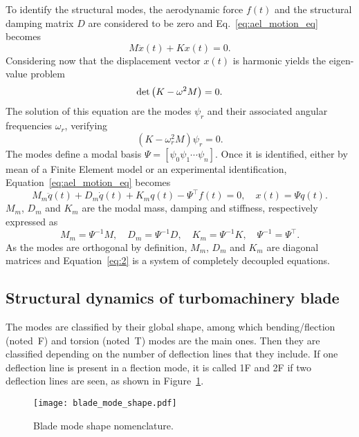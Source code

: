 To identify the structural modes, the aerodynamic force $f(t)$ and
the structural damping matrix $D$ are considered to be zero
and Eq.~\eqref{eq:ael_motion_eq} becomes
\begin{equation}
	M \ddot{x}(t) + K x(t) = 0.
	\label{eq:ael_motion_eq_free_response}
\end{equation}
Considering now that the displacement vector $x(t)$ is harmonic
yields the eigen-value problem
\begin{equation}
	\mdet \left(K - \omega^2 M  \right) = 0.
	\label{eq:ael_motion_eq_eigen_value}
\end{equation}
The solution of this equation are the modes $\psi_r$
and their associated angular frequencies $\omega_r$, verifying
\begin{equation}
	\left(K - \omega_r^2 M  \right) \psi_r = 0.
\end{equation}
The modes define a modal basis 
$\Psi = [\psi_0 \psi_1 \cdots \psi_n]$.
Once it
is identified, either by mean of a Finite
Element model or an experimental identification, 
Equation~\eqref{eq:ael_motion_eq} becomes
\begin{equation}
  \label{eq:2}
  M_m \ddot{q}(t) + D_m \dot{q}(t) + K_m q (t) - \Psi^\top f(t)=0, \quad x(t) = \Psi q(t).
\end{equation}
$M_m$, $D_m$ and $K_m$ are the modal mass, 
damping and stiffness, respectively expressed as
\begin{equation}
    M_m = \Psi ^{-1} M, \quad D_m = \Psi ^{-1} D, \quad K_m = \Psi ^{-1} K, \quad \Psi ^{-1}  = \Psi ^\top.
\end{equation}
As the modes are orthogonal by definition,
$M_m$, $D_m$ and $K_m$ are diagonal matrices and
Equation~\eqref{eq:2} is a system of completely decoupled equations.

\subsection{Structural dynamics of turbomachinery blade}
\label{sub:structural_dynamics_of_turbomachinery_blade}

The modes are classified by their global shape, among which 
bending/flection (noted~F) and torsion (noted~T) 
modes are the main ones. Then they are classified
depending on the number of deflection lines that they
include. If one deflection line is present in a flection 
mode, it is called 1F and 2F if two deflection lines are
seen, as shown in Figure~\ref{fig:blade_mode_shape}.
\begin{figure}[htp]
  \centering
  \texttt{[image: blade\_mode\_shape.pdf]}
  \caption{Blade mode shape nomenclature.}
  \label{fig:blade_mode_shape}
\end{figure}

